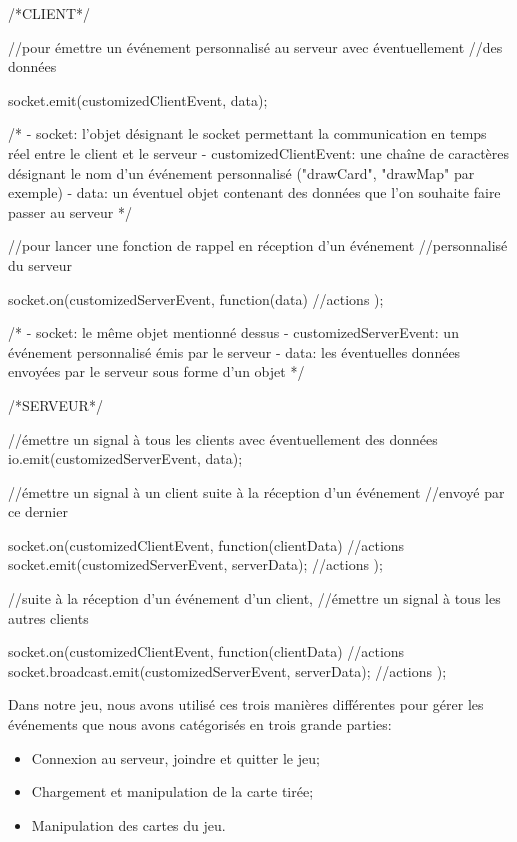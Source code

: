 \documentclass[12pt]{report}
\begin{document}
		\begin{verbatimtab}[4]
		/*CLIENT*/

		//pour émettre un événement personnalisé au serveur avec éventuellement
		//des données

		socket.emit(customizedClientEvent, data);

		/*
			- socket: l'objet désignant le socket permettant la communication en
			temps réel entre le client et le serveur
			- customizedClientEvent: une chaîne de caractères désignant le nom d'un
			événement personnalisé ("drawCard", "drawMap" par exemple)
			- data: un éventuel objet contenant des données que l'on souhaite
			faire passer au serveur
		*/

		//pour lancer une fonction de rappel en réception d'un événement
		//personnalisé du serveur

		socket.on(customizedServerEvent, function(data){
			//actions
		});

		/*
			- socket: le même objet mentionné dessus
			- customizedServerEvent: un événement personnalisé émis par le serveur
			- data: les éventuelles données envoyées par le serveur
			sous forme d'un objet
		*/

		/*SERVEUR*/

		//émettre un signal à tous les clients avec éventuellement des données
		io.emit(customizedServerEvent, data);

		//émettre un signal à un client suite à la réception d'un événement
		//envoyé par ce dernier

		socket.on(customizedClientEvent, function(clientData){
			//actions
			socket.emit(customizedServerEvent, serverData);
			//actions
		});

		//suite à la réception d'un événement d'un client,
		//émettre un signal à tous les autres clients

		socket.on(customizedClientEvent, function(clientData){
			//actions
			socket.broadcast.emit(customizedServerEvent, serverData);
			//actions
		});
		\end{verbatimtab}

		Dans notre jeu, nous avons utilisé ces trois manières différentes pour gérer les événements que nous avons catégorisés en trois grande parties:
		\begin{itemize}
			\item{Connexion au serveur, joindre et quitter le jeu;}
			\item{Chargement et manipulation de la carte tirée;}
			\item{Manipulation des cartes du jeu.}
		\end{itemize}
\end{document}
